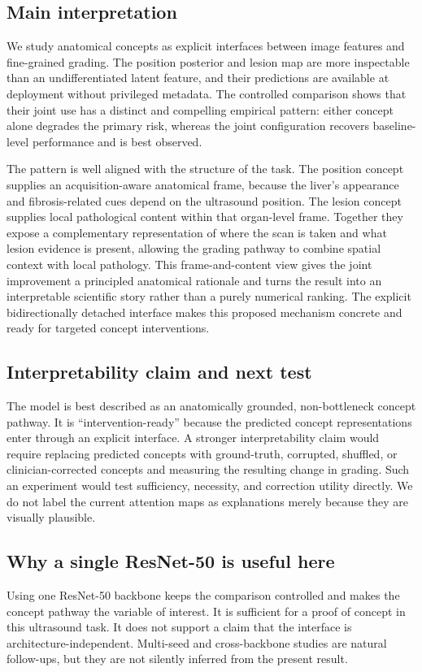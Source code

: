 \subsection{Main interpretation}
We study anatomical concepts as explicit interfaces between image features and fine-grained grading. The position posterior and lesion map are more inspectable than an undifferentiated latent feature, and their predictions are available at deployment without privileged metadata. The controlled comparison shows that their joint use has a distinct and compelling empirical pattern: either concept alone degrades the primary risk, whereas the joint configuration recovers baseline-level performance and is best observed.

The pattern is well aligned with the structure of the task. The position concept supplies an acquisition-aware anatomical frame, because the liver's appearance and fibrosis-related cues depend on the ultrasound position. The lesion concept supplies local pathological content within that organ-level frame. Together they expose a complementary representation of where the scan is taken and what lesion evidence is present, allowing the grading pathway to combine spatial context with local pathology. This frame-and-content view gives the joint improvement a principled anatomical rationale and turns the result into an interpretable scientific story rather than a purely numerical ranking. The explicit bidirectionally detached interface makes this proposed mechanism concrete and ready for targeted concept interventions.

\subsection{Interpretability claim and next test}
The model is best described as an anatomically grounded, non-bottleneck concept pathway. It is ``intervention-ready'' because the predicted concept representations enter through an explicit interface. A stronger interpretability claim would require replacing predicted concepts with ground-truth, corrupted, shuffled, or clinician-corrected concepts and measuring the resulting change in grading. Such an experiment would test sufficiency, necessity, and correction utility directly. We do not label the current attention maps as explanations merely because they are visually plausible.

\subsection{Why a single ResNet-50 is useful here}
Using one ResNet-50 backbone keeps the comparison controlled and makes the concept pathway the variable of interest. It is sufficient for a proof of concept in this ultrasound task. It does not support a claim that the interface is architecture-independent. Multi-seed and cross-backbone studies are natural follow-ups, but they are not silently inferred from the present result.


